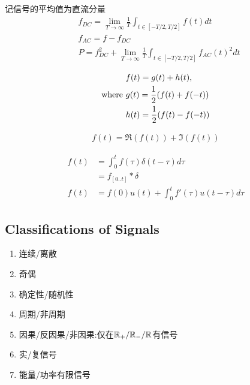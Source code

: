 \documentclass{article}
\begin{document}
     记信号的平均值为直流分量
    \begin{align}
        &f_{DC} = \lim_{T\to \infty} \frac{1}{T} \int_{t\in [-T/2, T/2]} f(t)dt\\
        &f_{AC} = f - f_{DC}\\
        &P = f_{DC}^2 + \lim_{T\to \infty} \frac{1}{T} \int_{t\in [-T/2, T/2]} f_{AC}(t)^2 dt
    \end{align}

     \begin{align}
        &f(t) = g(t) + h(t),\\
        \text{where } &g(t)=\frac{1}{2} (f(t)+f(-t))\\
        &h(t) = \frac{1}{2}(f(t)-f(-t))
    \end{align}

     \begin{align}
        f(t) = \Re(f(t)) + \Im(f(t))
    \end{align}

     \begin{align}
        f(t)&=\int^t_0 f(\tau) \delta(t-\tau)d\tau\\
        &=f_{[0..t]} * \delta\\
        f(t) &= f(0)u(t) + \int^t_0 f'(\tau) u(t-\tau)d\tau
    \end{align}


\subsection{Classifications of Signals}

    \begin{enumerate}
        \item 连续/离散
        \item 奇偶
        \item 确定性/随机性
        \item 周期/非周期
        \item 因果/反因果/非因果:仅在$\mathbb{R}_+/\mathbb{R}_-/\mathbb{R}$有信号
        \item 实/复信号
        \item 能量/功率有限信号
    \end{enumerate}
\end{document}
